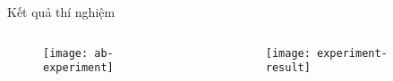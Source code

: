 \begin{frame}{Kết quả thí nghiệm}
	\begin{columns}
		\begin{column}{0.5\textwidth}
			\begin{figure}
				\centering
				\texttt{[image: ab-experiment]}
			\end{figure}
		\end{column}
		\begin{column}{0.5\textwidth}
			\begin{figure}
				\centering
				\texttt{[image: experiment-result]}
			\end{figure}
		\end{column}
	\end{columns}
\end{frame}
